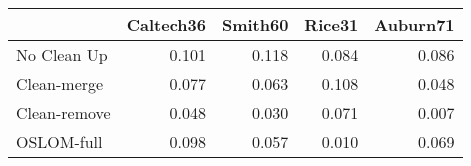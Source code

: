 \begin{tabular}{lrrrr}
\toprule
{} & Caltech36 & Smith60 & Rice31 & Auburn71 \\
\midrule
No Clean Up  &     0.101 &   0.118 &  0.084 &    0.086 \\
Clean-merge  &     0.077 &   0.063 &  0.108 &    0.048 \\
Clean-remove &     0.048 &   0.030 &  0.071 &    0.007 \\
OSLOM-full   &     0.098 &   0.057 &  0.010 &    0.069 \\
\bottomrule
\end{tabular}
